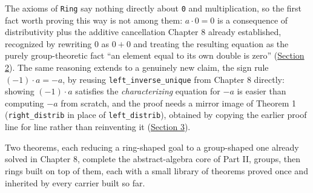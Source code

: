 The axioms of \texttt{Ring} say nothing directly about \texttt{0} and multiplication, so the first fact worth proving this way is not among them: \(a \cdot 0 =
0\) is a consequence of distributivity plus the additive cancellation Chapter 8 already established, recognized by rewriting \(0\) as \(0+0\) and treating the resulting equation as the purely group-theoretic fact ``an element equal to its own double is zero'' (\hyperref[sec:10-ring-theorems:02-theorem-1:1]{Section 2}). The same reasoning extends to a genuinely new claim, the sign rule \((-1)\cdot a = -a\), by reusing \texttt{left\_\allowbreak{}inverse\_\allowbreak{}unique} from Chapter 8 directly: showing \((-1)\cdot a\) satisfies the \emph{characterizing} equation for \(-a\) is easier than computing \(-a\) from scratch, and the proof needs a mirror image of Theorem 1 (\texttt{right\_\allowbreak{}distrib} in place of \texttt{left\_\allowbreak{}distrib}), obtained by copying the earlier proof line for line rather than reinventing it (\hyperref[sec:10-ring-theorems:03-theorem-2:1]{Section 3}).

Two theorems, each reducing a ring-shaped goal to a group-shaped one already solved in Chapter 8, complete the abstract-algebra core of Part II, groups, then rings built on top of them, each with a small library of theorems proved once and inherited by every carrier built so far.






